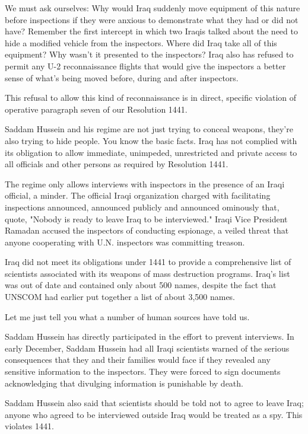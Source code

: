 \documentclass[10pt,a4paper]{article}
\begin{document}
We must ask ourselves: Why would Iraq suddenly move equipment of this nature before inspections if they were anxious to demonstrate what they had or did not have? Remember the first intercept in which two Iraqis talked about the need to hide a modified vehicle from the inspectors. Where did Iraq take all of this equipment? Why wasn't it presented to the inspectors? Iraq also has refused to permit any U-2 reconnaissance flights that would give the inspectors a better sense of what's being moved before, during and after inspectors.

This refusal to allow this kind of reconnaissance is in direct, specific violation of operative paragraph seven of our Resolution 1441.

Saddam Hussein and his regime are not just trying to conceal weapons, they're also trying to hide people. You know the basic facts. Iraq has not complied with its obligation to allow immediate, unimpeded, unrestricted and private access to all officials and other persons as required by Resolution 1441.

The regime only allows interviews with inspectors in the presence of an Iraqi official, a minder. The official Iraqi organization charged with facilitating inspections announced, announced publicly and announced ominously that, quote, "Nobody is ready to leave Iraq to be interviewed." Iraqi Vice President Ramadan accused the inspectors of conducting espionage, a veiled threat that anyone cooperating with U.N. inspectors was committing treason.

Iraq did not meet its obligations under 1441 to provide a comprehensive list of scientists associated with its weapons of mass destruction programs. Iraq's list was out of date and contained only about 500 names, despite the fact that UNSCOM had earlier put together a list of about 3,500 names.

Let me just tell you what a number of human sources have told us.

Saddam Hussein has directly participated in the effort to prevent interviews. In early December, Saddam Hussein had all Iraqi scientists warned of the serious consequences that they and their families would face if they revealed any sensitive information to the inspectors. They were forced to sign documents acknowledging that divulging information is punishable by death.

Saddam Hussein also said that scientists should be told not to agree to leave Iraq; anyone who agreed to be interviewed outside Iraq would be treated as a spy. This violates 1441.
\end{document}

